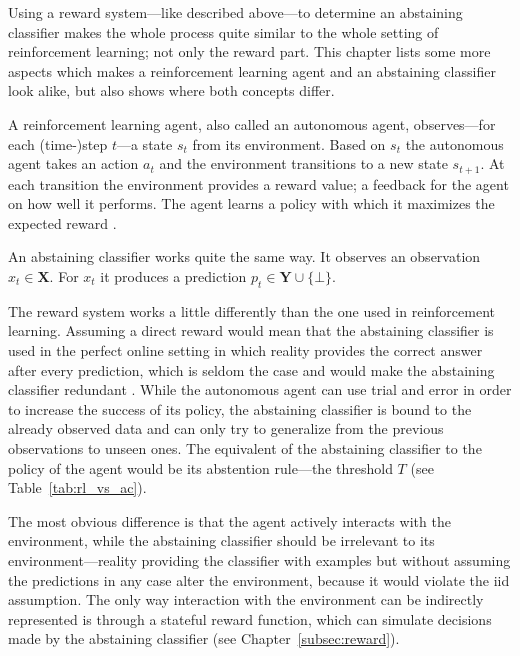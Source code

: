 \documentclass[twoside,11pt]{article}
\def\X{\textbf{X}}
\def\Y{\textbf{Y}}
\begin{document}
Using a reward system---like described above---to determine
an abstaining classifier makes the whole process quite
similar to the whole setting of reinforcement learning; not
only the reward part. This chapter lists some more aspects
which makes a reinforcement learning agent and an
abstaining classifier look alike, but also shows where
both concepts differ.

A reinforcement learning agent, also called an autonomous
agent, observes---for each (time-)step $t$---a state $s_t$
from its environment.
Based on $s_t$ the autonomous agent takes an action $a_t$
and the environment transitions to a new state $s_{t+1}$.
At each transition the environment provides a reward
value; a feedback for the agent on how well it performs.
The agent learns a policy with which it maximizes the
expected reward \citep[see][]{arulkumaran_et_al_2017}.

An abstaining classifier works quite the same way.
It observes an observation $x_t \in \X$.
For $x_t$ it produces a prediction $p_t \in \Y \cup
\{\bot\}$.

The reward system works a little differently than the one
used in reinforcement learning. Assuming a direct reward
would mean that the abstaining classifier is used in the
perfect online setting in which reality provides the
correct answer after every prediction, which is seldom the
case and would make the abstaining classifier redundant
\citep[see][Chapter 4.3]{alrw}.
While the autonomous agent can use trial and error in order
to increase the success of its policy, the abstaining
classifier is bound to the already observed data and can
only try to generalize from the previous observations to
unseen ones.
The equivalent of the abstaining classifier to the policy
of the agent would be its abstention rule---the threshold
$T$ (see Table~\ref{tab:rl_vs_ac}).

The most obvious difference is that the agent actively
interacts with the environment, while the abstaining
classifier should be irrelevant to its
environment---reality providing the classifier with
examples but without assuming the predictions in any case
alter the environment, because it would violate the iid
assumption. The only way interaction with the
environment can be indirectly represented is through a
stateful reward function, which can simulate decisions made
by the abstaining classifier
(see Chapter~\ref{subsec:reward}).
\end{document}
